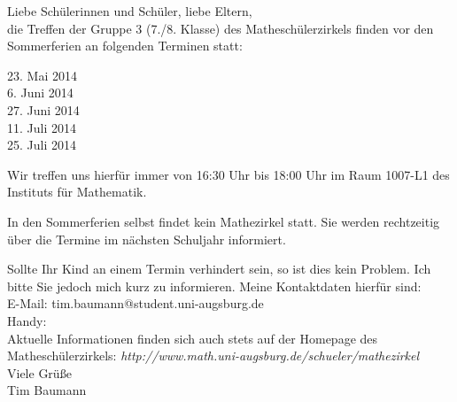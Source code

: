 \documentclass{infozettel}
\begin{document}
\renewcommand{\betreff}{Informationen zum Mathesch\"ulerzirkel der Universit\"at Augsburg\\ (7./8. Klasse -- Gruppe 3)}

\makeletterhead
Liebe Sch\"ulerinnen und Sch\"uler, liebe Eltern,\\[5pt]
die Treffen der Gruppe 3 (7./8. Klasse) des Mathesch\"ulerzirkels finden vor den Sommerferien an folgenden Terminen statt:
\begin{center}
23. Mai 2014\\
6. Juni 2014\\
27. Juni 2014\\
11. Juli 2014\\
25. Juli 2014
\end{center}
Wir treffen uns hierf\"ur immer von 16:30 Uhr bis 18:00 Uhr im Raum 1007-L1 des Instituts f\"ur Mathematik.

In den Sommerferien selbst findet kein Mathezirkel statt. Sie werden rechtzeitig über die Termine im nächsten Schuljahr informiert.

Sollte Ihr Kind an 
einem Termin verhindert sein, so ist dies kein Problem. Ich bitte Sie jedoch mich kurz zu informieren. Meine Kontaktdaten hierf\"ur sind:\\
E-Mail: tim.baumann@student.uni-augsburg.de\\
Handy: \\

Aktuelle Informationen finden sich auch stets auf der Homepage des Mathesch\"ulerzirkels:
\textsl{http:/\!/www.math.uni-augsburg.de/schueler/mathezirkel}\\

Viele Gr\"u\ss{}e\\[1.5cm]
Tim Baumann\\[1.1cm]
\end{document}
